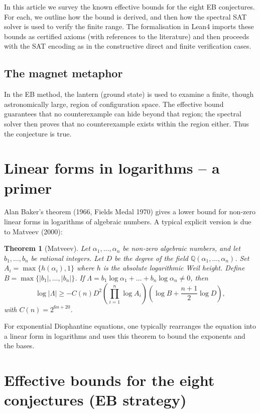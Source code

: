 \documentclass[11pt,a4paper]{article}
\newtheorem{theorem}{Theorem}[section]
\begin{document}
In this article we survey the known effective bounds for the eight EB conjectures. For each, we outline how the bound is derived, and then how the spectral SAT solver is used to verify the finite range. The formalisation in Lean4 imports these bounds as certified axioms (with references to the literature) and then proceeds with the SAT encoding as in the constructive direct and finite verification cases.

\subsection{The magnet metaphor}

In the EB method, the lantern (ground state) is used to examine a finite, though astronomically large, region of configuration space. The effective bound guarantees that no counterexample can hide beyond that region; the spectral solver then proves that no counterexample exists within the region either. Thus the conjecture is true.

\section{Linear forms in logarithms – a primer}

Alan Baker's theorem (1966, Fields Medal 1970) gives a lower bound for non‑zero linear forms in logarithms of algebraic numbers. A typical explicit version is due to Matveev (2000):

\begin{theorem}[Matveev]
Let \(\alpha_1,\dots,\alpha_n\) be non‑zero algebraic numbers, and let \(b_1,\dots,b_n\) be rational integers. Let \(D\) be the degree of the field \(\mathbb{Q}(\alpha_1,\dots,\alpha_n)\). Set \(A_i = \max\{h(\alpha_i), 1\}\) where \(h\) is the absolute logarithmic Weil height. Define \(B = \max\{|b_1|,\dots,|b_n|\}\). If \(\Lambda = b_1\log\alpha_1 + \dots + b_n\log\alpha_n \neq 0\), then
\[
\log|\Lambda| \ge - C(n) D^2 \left( \prod_{i=1}^n \log A_i \right) \left( \log B + \frac{n+1}{2}\log D \right),
\]
with \(C(n) = 2^{6n+20}\).
\end{theorem}

For exponential Diophantine equations, one typically rearranges the equation into a linear form in logarithms and uses this theorem to bound the exponents and the bases.

\section{Effective bounds for the eight conjectures (EB strategy)}
\end{document}
